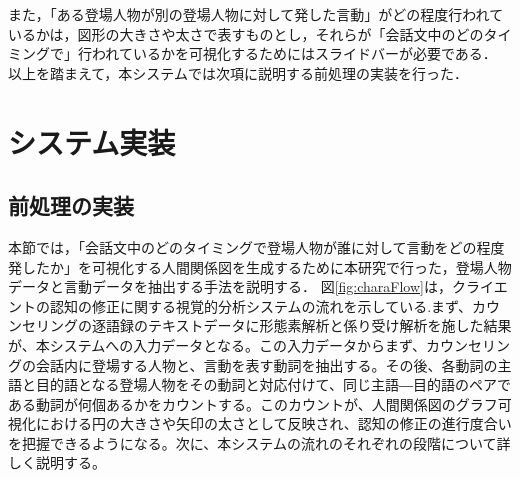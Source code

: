 \documentclass[shuuron]{kuee}
\begin{document}
また，「ある登場人物が別の登場人物に対して発した言動」がどの程度行われているかは，図形の大きさや太さで表すものとし，それらが「会話文中のどのタイミングで」行われているかを可視化するためにはスライドバーが必要である．
以上を踏まえて，本システムでは次項に説明する前処理の実装を行った．







\section{システム実装} %

\subsection{前処理の実装} %


本節では，「会話文中のどのタイミングで登場人物が誰に対して言動をどの程度発したか」を可視化する人間関係図を生成するために本研究で行った，登場人物データと言動データを抽出する手法を説明する．%
 図\ref{fig:charaFlow}は，クライエントの認知の修正に関する視覚的分析システムの流れを示している.まず、カウンセリングの逐語録のテキストデータに形態素解析と係り受け解析を施した結果が、本システムへの入力データとなる。この入力データからまず、カウンセリングの会話内に登場する人物と、言動を表す動詞を抽出する。その後、各動詞の主語と目的語となる登場人物をその動詞と対応付けて、同じ主語―目的語のペアである動詞が何個あるかをカウントする。このカウントが、人間関係図のグラフ可視化における円の大きさや矢印の太さとして反映され、認知の修正の進行度合いを把握できるようになる。次に、本システムの流れのそれぞれの段階について詳しく説明する。
\end{document}
